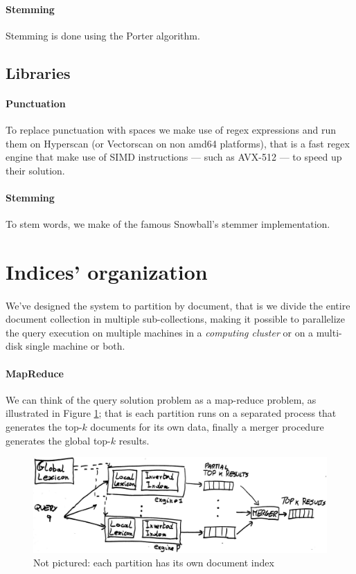 \paragraph{Stemming}
Stemming is done using the Porter algorithm.

\subsection{Libraries}

\paragraph{Punctuation}
To replace punctuation with spaces we make use of regex expressions and run them on Hyperscan (or Vectorscan on non amd64 platforms), that is a fast regex engine that make use of SIMD instructions --- such as AVX-512 --- to speed up their solution.

\paragraph{Stemming}
To stem words, we make of the famous Snowball's stemmer implementation.

\section{Indices' organization}

\paragraph{}
We've designed the system to partition by document, that is we divide the entire document collection in multiple sub-collections, making it possible to parallelize the query execution on multiple machines in a \textit{computing cluster} or on a multi-disk single machine or both.

\paragraph{MapReduce}
We can think of the query solution problem as a map-reduce problem, as illustrated in Figure \ref{fig:mapreduce}; that is each partition runs on a separated process that generates the top-$k$ documents for its own data, finally a merger procedure generates the global top-$k$ results.

\begin{figure}[h]
	\centering
	\includegraphics[width=0.95\linewidth]{assets/map_reduce}
	\caption{Not pictured: each partition has its own document index}
	\label{fig:mapreduce}
\end{figure}


